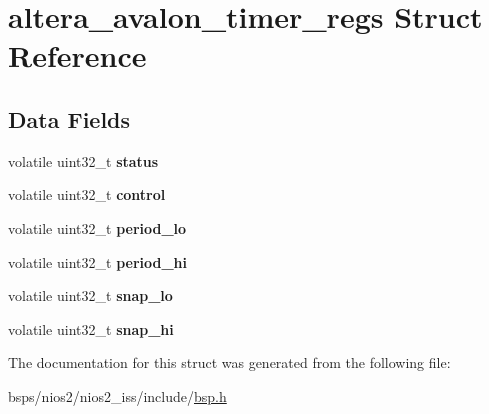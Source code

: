 \hypertarget{structaltera__avalon__timer__regs}{}\section{altera\+\_\+avalon\+\_\+timer\+\_\+regs Struct Reference}
\label{structaltera__avalon__timer__regs}
\subsection*{Data Fields}
\begin{DoxyCompactItemize}
\item 
\mbox{\label{structaltera__avalon__timer__regs_a8a9f08658ca9d0b17a6c580eb5f7c2ff}} 
volatile uint32\+\_\+t {\bfseries status}
\item 
\mbox{\label{structaltera__avalon__timer__regs_a7f4af5a81b62224bad09e53bfca5b94b}} 
volatile uint32\+\_\+t {\bfseries control}
\item 
\mbox{\label{structaltera__avalon__timer__regs_a051a9cb39e9b224d4326bd27675fb1e8}} 
volatile uint32\+\_\+t {\bfseries period\+\_\+lo}
\item 
\mbox{\label{structaltera__avalon__timer__regs_a743b851266eb93900bb3c05f8decfb77}} 
volatile uint32\+\_\+t {\bfseries period\+\_\+hi}
\item 
\mbox{\label{structaltera__avalon__timer__regs_a403c2f3160799427b27bde4867515dd8}} 
volatile uint32\+\_\+t {\bfseries snap\+\_\+lo}
\item 
\mbox{\label{structaltera__avalon__timer__regs_afef28774b5b042fd9201e0b89ce69acb}} 
volatile uint32\+\_\+t {\bfseries snap\+\_\+hi}
\end{DoxyCompactItemize}


The documentation for this struct was generated from the following file\+:\begin{DoxyCompactItemize}
\item 
bsps/nios2/nios2\+\_\+iss/include/\mbox{\hyperlink{bsps_2nios2_2nios2__iss_2include_2bsp_8h}{bsp.\+h}}\end{DoxyCompactItemize}
